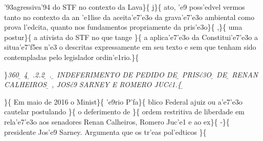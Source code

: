 '93agressiva'94 do STF no contexto da Lava\}\{\rtlch{} 
\ltrch{}  j\}\{\rtlch{}  \ltrch{}
 ato, 'e9 poss'edvel vermos tanto no
contexto da an 'e1lise da aceita'e7'e3o da grava'e7'e3o ambiental como
prova l'edcita, quanto nos fundamentos propriamente da
pris'e3o\}\{\rtlch{}  \ltrch{}  ,\}\{\rtlch{}
 \ltrch{}  uma postur\}\{
\rtlch{}  \ltrch{}  a ativista do STF no que
tange \}\{\rtlch{}  \ltrch{} 
a aplica'e7'e3o da Constitui'e7'e3o a situa'e7'f5es n'e3 o descritas
expressamente em seu texto e sem que tenham sido contempladas pelo
legislador ordin'e1rio.\}\{\rtlch{}  \ltrch{}
\par \}\pard \ltrpar\qj {}\sl360\widctlpar\wrapdefault\aspalpha\aspnum\faauto\adjustright{} {\rtlch{} \ab{} \ltrch{} \b{} 4}{\rtlch{} \ab{} \ltrch{} 
\b{} .2.2}{\rtlch{} \ab{} \ltrch{} \b{} .}{\rtlch{} \ab{} \ltrch{} \b{}  INDEFERIMENTO DE PEDIDO DE}{\rtlch{} \ab{} \ltrch{} 
\b{}  PRIS\'c3O }{\rtlch{} \ab{} \ltrch{} \b{} DE }{\rtlch{} \ab{} \ltrch{} \b{} RENAN CALHEIROS}{\rtlch{} 
\ab{} \ltrch{} \b{} , JOS\'c9 SARNEY E ROMERO JUC\'c1.}\{\rtlch{}
\ab{} \ltrch{} \b{}\\
\par \}\{\rtlch{}  \ltrch{} 
\tab Em maio de 2016 o Minist\}\{\rtlch{}  \ltrch{}
 'e9rio P'fa\}\{\rtlch{} 
\ltrch{}  blico Federal ajuiz ou
a'e7'e3o cautelar postulando \}\{\rtlch{}  \ltrch{}
 o deferimento de \}\{\rtlch{}  \ltrch{}
 ordem restritiva de liberdade em
rela'e7'e3o aos senadores Renan Calheiros, Romero Juc'e1 e ao
ex\}\{\rtlch{}  \ltrch{}  -\}\{\rtlch{} 
\ltrch{}  presidente Jos'e9 Sarney.
Argumenta que os tr'eas pol'edticos \}\{\rtlch{}  \ltrch{}
